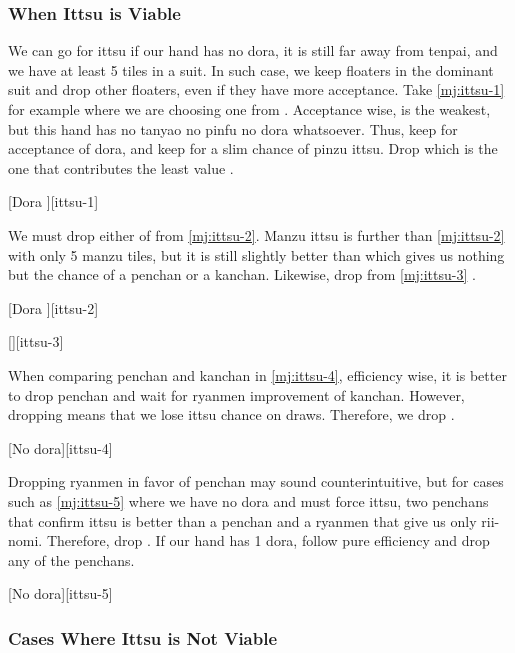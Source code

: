 \documentclass[12pt]{article}
\begin{document}
\subsubsection*{When Ittsu is Viable}

We can go for ittsu if our hand has no dora, it is still far away from tenpai, and we have at least 5 tiles in a suit. In such case, we keep floaters in the dominant suit and drop other floaters, even if they have more acceptance. Take \ref{mj:ittsu-1} for example where we are choosing one from . Acceptance wise,  is the weakest, but this hand has no tanyao no pinfu no dora whatsoever. Thus, keep  for acceptance of  dora, and keep  for a slim chance of pinzu ittsu. Drop  which is the one that contributes the least value \citep[][p.~68]{zero-teyaku}.

[Dora ][ittsu-1]

We must drop either of  from \ref{mj:ittsu-2}. Manzu ittsu is further than \ref{mj:ittsu-2} with only 5 manzu tiles, but it is still slightly better than  which gives us nothing but the chance of a penchan or a kanchan. Likewise, drop  from \ref{mj:ittsu-3} \citep[][p.~69]{zero-teyaku}.

[Dora ][ittsu-2]

[][ittsu-3]

When comparing  penchan and  kanchan in \ref{mj:ittsu-4}, efficiency wise, it is better to drop penchan and wait for ryanmen improvement of kanchan. However, dropping  means that we lose ittsu chance on  draws. Therefore, we drop  \citep[][pp.~68--69]{zero-teyaku}.

[No dora][ittsu-4]

Dropping ryanmen in favor of penchan may sound counterintuitive, but for cases such as \ref{mj:ittsu-5} where we have no dora and must force ittsu, two penchans that confirm ittsu is better than a penchan and a ryanmen that give us only rii-nomi. Therefore, drop  \citep{gendai-ittsu}. If our hand has 1 dora, follow pure efficiency and drop any of the penchans.

[No dora][ittsu-5]


\subsubsection*{Cases Where Ittsu is Not Viable}
\end{document}
